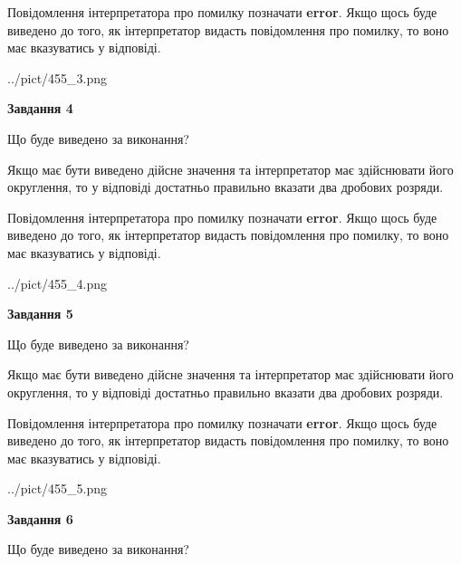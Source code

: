 \documentclass[12pt, ukrainian]{article}
\begin{document}
{\begin {Large}
Повідомлення інтерпретатора про помилку позначати \textbf{error}.
Якщо щось буде виведено до того, як інтерпретатор видасть повідомлення про помилку, 
то воно має вказуватись у відповіді. \par

\begin{center}
	{../pict/455_3.png}
\end{center}
\newpage

{\begin {center}\textbf{Завдання 4}\end {center}}\par
Що буде виведено за виконання? \par

Якщо має бути виведено дійсне значення та інтерпретатор має здійснювати його округлення, 
то у відповіді достатньо правильно вказати два дробових розряди.

Повідомлення інтерпретатора про помилку позначати \textbf{error}.
Якщо щось буде виведено до того, як інтерпретатор видасть повідомлення про помилку, 
то воно має вказуватись у відповіді. \par

\begin{center}
	{../pict/455_4.png}
\end{center}
\newpage

{\begin {center}\textbf{Завдання 5}\end {center}}\par
Що буде виведено за виконання? \par

Якщо має бути виведено дійсне значення та інтерпретатор має здійснювати його округлення, 
то у відповіді достатньо правильно вказати два дробових розряди.

Повідомлення інтерпретатора про помилку позначати \textbf{error}.
Якщо щось буде виведено до того, як інтерпретатор видасть повідомлення про помилку, 
то воно має вказуватись у відповіді. \par

\begin{center}
	{../pict/455_5.png}
\end{center}
\newpage

{\begin {center}\textbf{Завдання 6}\end {center}}\par
Що буде виведено за виконання? \par


\end{Large}}
\end{document}
